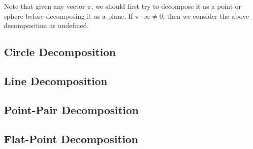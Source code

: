 \documentclass[12pt]{article}
\newcommand{\nvai}{\infty}
\begin{document}
Note that given any vector $\pi$, we should first try to decompose it as a point or
sphere before decomposing it as a plane.  If $\pi\cdot\nvai\neq 0$, then we consider
the above decomposition as undefined.

\subsection{Circle Decomposition}

\subsection{Line Decomposition}

\subsection{Point-Pair Decomposition}

\subsection{Flat-Point Decomposition}
\end{document}
